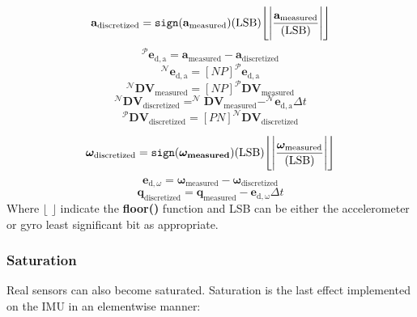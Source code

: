 \begin{equation}
\mathbf{a}_{\mathrm{discretized}} = \verb|sign|(\mathbf{a}_\mathrm{measured})(\mathrm{LSB})\Biggl\lfloor\Biggl|\frac{\mathbf{a}_{\mathrm{measured}}}{(\mathrm{LSB})}\Biggr|\Biggr\rfloor
\end{equation}
\begin{equation}
^\mathcal{P}\mathbf{e}_{\mathrm{d},\mathrm{a}} = \mathbf{a}_{\mathrm{measured}} - \mathbf{a}_{\mathrm{discretized}}
\end{equation}
\begin{equation}
^\mathcal{N}\mathbf{e}_{\mathrm{d},\mathrm{a}} = [NP] ^\mathcal{P}\mathbf{e}_{\mathrm{d},\mathrm{a}}
\end{equation}
\begin{equation}
^\mathcal{N}\mathbf{DV}_{\mathrm{measured}} = [NP] ^\mathcal{P}\mathbf{DV}_{\mathrm{measured}}
\end{equation}
\begin{equation}
^\mathcal{N}\mathbf{DV}_{\mathrm{discretized}} =  ^\mathcal{N}\mathbf{DV}_{\mathrm{measured}} -^\mathcal{N}\mathbf{e}_{\mathrm{d},\mathrm{a}} \Delta t
\end{equation}
\begin{equation}
	^\mathcal{P}\mathbf{DV}_{\mathrm{discretized}} = [PN]^\mathcal{N}\mathbf{DV}_{\mathrm{discretized}}
\end{equation}

\begin{equation}
\bm{\omega}_{\mathrm{discretized}} = \verb|sign|(\bm{\bm{\omega}_\mathrm{measured}})(\mathrm{LSB})\Biggl\lfloor\Biggl|\frac{\bm{\omega}_{\mathrm{measured}}}{(\mathrm{LSB})}\Biggr|\Biggr\rfloor
\end{equation}
\begin{equation}
\mathbf{e}_{\mathrm{d},\omega} =\bm{\omega}_{\mathrm{measured}} - \bm{\omega}_{\mathrm{discretized}}
\end{equation}
\begin{equation}
\mathbf{q}_{\mathrm{discretized}} = \mathbf{q}_{\mathrm{measured}} - \mathbf{e}_{\mathrm{d},\mathrm{\omega}}\Delta t
\end{equation}
Where $\lfloor$  $\rfloor$ indicate the \textbf{floor()} function and LSB can be either the accelerometer or gyro least significant bit as appropriate.

\subsubsection{Saturation}
Real sensors can also become saturated. Saturation is the last effect implemented on the IMU in an elementwise manner:

